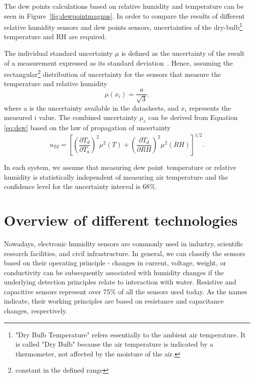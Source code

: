 The dew points calculations based on relative humidity and temperature can be seen in Figure~\ref{fig:dewpointmagnus}. In order to compare the results of different relative humidity sensors and dew points sensors, uncertainties of the dry-bulb\footnote{"Dry Bulb Temperature" refers essentially to the ambient air temperature. It is called "Dry Bulb" because the air temperature is indicated by a thermometer, not affected by the moisture of the air.} temperature and \gls{RH} are required.

The individual standard uncertainty $\mu$ is defined as the uncertainty of the result of a measurement expressed as its standard deviation~\cite{NIST_1994}. Hence, assuming the rectangular\footnote{constant in the defined range} distribution of uncertainty for the sensors that measure the temperature and relative humidity
\begin{equation}
    \mu(x_{i}) = \frac{a}{\sqrt{3}}.
\end{equation}
where a is the uncertainty available in the datasheets, and $x_{i}$ represents the measured $i$ value. The combined uncertainty $\mu_{c}$ can be derived from Equation \ref{eq:dew} based on the law of propagation of uncertainty~\cite{dp_uncertainty}
\begin{equation}
    u_{Td} = \left [  \left (\frac{\partial T_{d}}{\partial T_{a}}  \right )^{2} \mu^{2}(T) + \left (\frac{\partial T_{d}}{\partial RH}  \right )^{2} \mu^{2}(RH)\right ]^{1/2}.
    \label{dp_error}
\end{equation}

In each system, we assume that measuring dew point temperature or relative humidity is statistically independent of measuring air temperature and the confidence level for the uncertainty interval is 68\%.  

\section{Overview of different technologies}

Nowadays, electronic humidity sensors are commonly used in industry, scientific research facilities, and civil infrastructure. In general, we can classify the sensors based on their operating principle - changes in current, voltage, weight, or conductivity can be subsequently associated with humidity changes if the underlying detection principles relate to interaction with water. Resistive and capacitive sensors represent over 75\% of all the sensors used today. As the names indicate, their working principles are based on resistance and capacitance changes, respectively.


